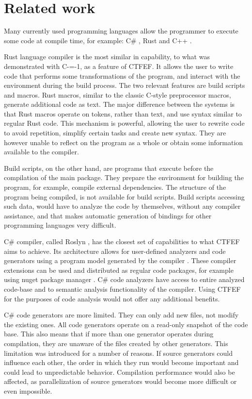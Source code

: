 \section{Related work}
\label{related-work}

Many currently used programming languages allow the programmer to execute some code at compile time, for example: C\# \cite{csharp:source_generators,roslyn}, Rust \cite{rust, klabnik2019rust} and C++ \cite{ISO:cpp20}.

Rust language compiler is the most similar in capability, to what was demonstrated with C-=-1, as a feature of CTFEF.
It allows the user to write code that performs some transformations of the program, and interact with the environment during the build process.
The two relevant features are build scripts and macros.
Rust macros, similar to the classic C-style preprocessor macros, generate additional code as text.
The major difference between the systems is that Rust macros operate on tokens, rather than text, and use syntax similar to regular Rust code.
This mechanism is powerful, allowing the user to rewrite code to avoid repetition, simplify certain tasks and create new syntax.
They are however unable to reflect on the program as a whole or obtain some information available to the compiler.

Build scripts, on the other hand, are programs that execute before the compilation of the main package.
They prepare the environment for building the program, for example, compile external dependencies.
The structure of the program being compiled, is not available for build scripts.
Build scripts accessing such data, would have to analyze the code by themselves, without any compiler assistance, and that makes automatic generation of bindings for other programming languages very difficult.

C\# compiler, called Roslyn \cite{roslyn}, has the closest set of capabilities to what CTFEF aims to achieve.
Its architecture allows for user-defined analyzers and code generators using a program model generated by the compiler \cite{vermeir2022net}.
These compiler extensions can be used and distributed as regular code packages, for example using nuget package manager \cite{balliauw2013nuget}.
C\# code analyzers have access to entire analyzed code-base and to semantic analysis functionality of the compiler.
Using CTFEF for the purposes of code analysis would not offer any additional benefits.

C\# code generators are more limited.
They can only add new files, not modify the existing ones.
All code generators operate on a read-only snapshot of the code base.
This also means that if more than one generator operates during compilation, they are unaware of the files created by other generators\cite{slimaksource}.
This limitation was introduced for a number of reasons.
If source generators could influence each other, the order in which they run would become important and could lead to unpredictable behavior.
Compilation performance would also be affected, as parallelization of source generators would become more difficult or even impossible.


